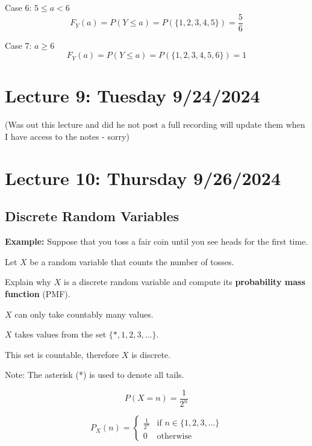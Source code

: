 \documentclass{article}
\begin{document}
    Case 6: \(5 \leq a < 6\)
    \[
        F_Y(a) = P(Y \leq a) = P(\{1, 2, 3, 4, 5\}) = \frac{5}{6}
    \]

    Case 7: \(a \geq 6\)
    \[
        F_Y(a) = P(Y \leq a) = P(\{1, 2, 3, 4, 5, 6\}) = 1
    \]



    \section*{Lecture 9: Tuesday 9/24/2024}
    (Was out this lecture and did he not post a full recording will update them when I have access to the notes - sorry)




    \section*{Lecture 10: Thursday 9/26/2024}

    \subsection*{Discrete Random Variables}

    \textbf{Example:} Suppose that you toss a fair coin until you see heads for the first time.

    Let \(X\) be a random variable that counts the number of tosses.

    Explain why \(X\) is a discrete random variable and compute its \textbf{probability mass function} (PMF).

    \(X\) can only take countably many values. 

    \(X\) takes values from the set \(\{*, 1, 2, 3, \ldots\}\).

    This set is countable, therefore \(X\) is discrete.

    Note: The asterisk (*) is used to denote all tails.

    \[
        P(X = n) = \frac{1}{2^n}
    \]

    \[
        P_X(n) = 
        \begin{cases} 
            \frac{1}{2^n} & \text{if } n \in \{1, 2, 3, \ldots\} \\
            0 & \text{otherwise}
        \end{cases}
    \]
\end{document}
